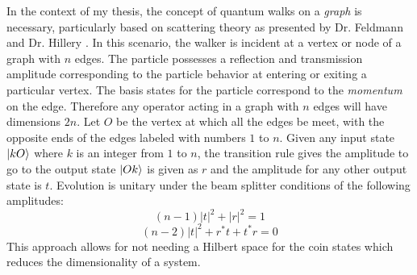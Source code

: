 In the context of my thesis, the concept of quantum walks on a \textit{graph} is necessary, particularly based on scattering theory as presented by Dr. Feldmann and Dr. Hillery \cite{FELDMAN2004277}. In this scenario, the walker is incident at a vertex or node of a graph with $n$ edges. The particle possesses a reflection and transmission amplitude corresponding to the particle behavior at entering or exiting a particular vertex. The basis states for the particle correspond to the \textit{momentum} on the edge. Therefore any operator acting in a graph with $n$ edges will have dimensions $2n$. \newline
Let $O$ be the vertex at which all the edges be meet, with the opposite ends of the edges labeled with numbers $1$ to $n$. Given any input state $\ket{kO}$ where $k$ is an integer from $1$ to $n$, the transition rule gives the amplitude to go to the output state $\ket{Ok}$ is given as $r$ and the amplitude for any other output state is $t$. Evolution is unitary under the beam splitter conditions of the following amplitudes:
\begin{equation}
    (n-1)|t|^2 + |r|^2 = 1
\end{equation}
\begin{equation}
    (n-2)|t|^2 + r^{*}t + t^{*}r = 0
\end{equation}
This approach allows for not needing a Hilbert space for the coin states which reduces the dimensionality of a system. 
\newpage
